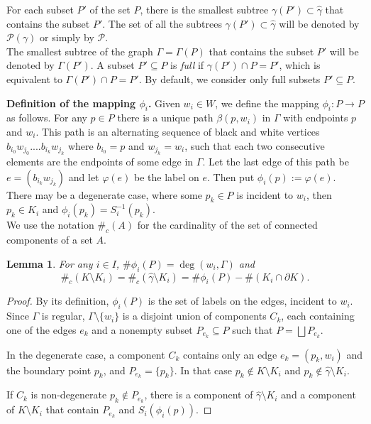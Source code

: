 \documentclass[11pt,reqno]{amsart}
\newtheorem{lemma}[theorem]{Lemma}
\newcommand{\IN}{{\subseteq}}
\newcommand{\hga}{{\hat\gamma}}
\begin{document}
For each subset $P'$ of the set $P$, there is the smallest subtree  $\gamma(P') \subset \hga$ that contains the subset $P'$. 
The set of all the  subtrees  $\gamma(P')\subset \hga$ will be denoted by $\mathcal{P}(\gamma)$ or simply by $\mathcal{P}$.\\
The smallest subtree of the graph $\Gamma=\Gamma(P)$ that contains the subset $P'$ will be denoted by $\Gamma(P')$.
A subset $P'\IN P$ is {\em full} if $\gamma(P') \cap P=P'$, which is equivalent to $\Gamma(P') \cap P=P'$. By default, we consider only full subsets $P'\IN P$.


{\bf Definition of the mapping $\phi_i$.} Given $w_i\in  W$, we define the mapping $\phi_i:P\to P$ as follows.
For any   $p\in P$  there is a unique path $\beta(p,w_i)$  in $\Gamma$ with endpoints $p$ and $w_i$.
This path is an alternating sequence of  black and white vertices  $b_{i_0} w_{j_0}....b_{i_k} w_{j_k} $ 
 where $b_{i_0}=p$ and $w_{j_k}=w_i$,  such that each two consecutive elements are the endpoints 
 of some edge in $\Gamma$. Let the last edge of this path be $e=(b_{i_k} w_{j_k})$   and  let $\varphi(e)$ be the label on $e$. Then  put $\phi_i(p):=\varphi(e)$.\\
 
 There may be a degenerate case, where some $p_k\in P$ is incident to $w_i$, then $p_k\in K_i$ and $\phi_i(p_k)=S_i^{-1}(p_k)$.\\



We use the notation $\#_c(A)$ for the cardinality of the set of connected components of a set  $A$.\\

\begin{lemma}\label{degwi}
For any $i\in I$,  $\#\phi_i(P)= \deg(w_i, \Gamma)$ and
$$\#_c(K\setminus K_i)=\#_c(\hga\setminus K_i)=\#\phi_i(P) -\#(K_i\cap \partial K). 
$$
\end{lemma}
\begin{proof}
By its definition, $\phi_i(P)$ is the set of labels on the edges, incident to $w_i$. Since $\Gamma$ is regular, 
$\Gamma\setminus \{w_i\}$ is a disjoint union of components $C_k$, each containing one of the edges $e_k$ and a nonempty subset $P_{e_k}\IN P$ such that $P=\bigsqcup P_{e_k}$.

 In the  degenerate
case, a component $C_k$ contains only an edge $e_k=(p_k,w_i)$ and the boundary point $p_k$, and $P_{e_k}=\{p_k\}$. In that case $p_k\notin K\setminus K_i$ and $p_k\notin \hga\setminus K_i$.

If $C_k$ is non-degenerate $p_k\notin P_{e_k}$, there is a component of $\hga\setminus K_i$ and a component of   $K\setminus K_i$ that contain $P_{e_k}$ and $S_i(\phi_i(p))$.
    
\end{proof}
 
\end{document}
